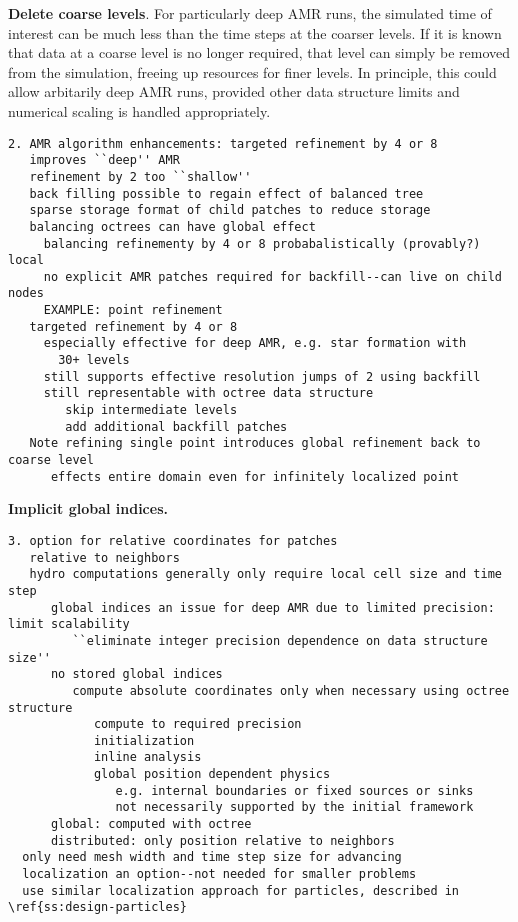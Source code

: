 \documentclass[10pt]{article}
\begin{document}

\textbf{Delete coarse levels}.  For particularly
deep AMR runs, the simulated time of interest can be much less
than the time steps at the coarser levels.  If it is known that
data at a coarse level is no longer required, that level can
simply be removed from the simulation, freeing up resources for
finer levels.  In principle, this could allow arbitarily deep AMR runs,
provided other data structure limits and numerical scaling is
handled appropriately.


\begin{verbatim}
2. AMR algorithm enhancements: targeted refinement by 4 or 8
   improves ``deep'' AMR
   refinement by 2 too ``shallow''
   back filling possible to regain effect of balanced tree
   sparse storage format of child patches to reduce storage 
   balancing octrees can have global effect
     balancing refinementy by 4 or 8 probabalistically (provably?) local
     no explicit AMR patches required for backfill--can live on child nodes 
     EXAMPLE: point refinement
   targeted refinement by 4 or 8
     especially effective for deep AMR, e.g. star formation with
       30+ levels
     still supports effective resolution jumps of 2 using backfill
     still representable with octree data structure 
        skip intermediate levels
        add additional backfill patches
   Note refining single point introduces global refinement back to coarse level
      effects entire domain even for infinitely localized point
\end{verbatim}



\textbf{Implicit global indices.}

\begin{verbatim}
3. option for relative coordinates for patches   
   relative to neighbors
   hydro computations generally only require local cell size and time step
      global indices an issue for deep AMR due to limited precision: limit scalability
         ``eliminate integer precision dependence on data structure size''       
      no stored global indices
         compute absolute coordinates only when necessary using octree structure
            compute to required precision
            initialization
            inline analysis
            global position dependent physics
               e.g. internal boundaries or fixed sources or sinks
               not necessarily supported by the initial framework
      global: computed with octree
      distributed: only position relative to neighbors
  only need mesh width and time step size for advancing
  localization an option--not needed for smaller problems
  use similar localization approach for particles, described in \ref{ss:design-particles}
\end{verbatim}
\end{document}
